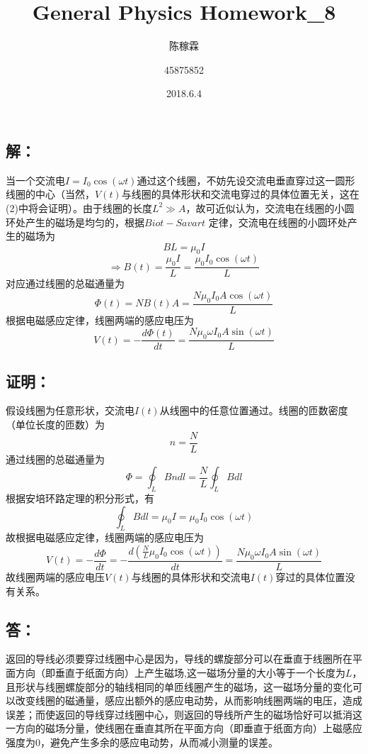 \documentclass[10pt,a4paper]{article}
\title{General Physics Homework\_{}8}
\author{陈稼霖 \and 45875852}
\date{2018.6.4}
\theoremstyle{remark}
\begin{document}
\maketitle
\section{}
\subsection{解：}
当一个交流电$I = I_0\cos(\omega t)$通过这个线圈，不妨先设交流电垂直穿过这一圆形线圈的中心（当然，$V(t)$与线圈的具体形状和交流电穿过的具体位置无关，这在(2)中将会证明）。由于线圈的长度$L^2\gg A$，故可近似认为，交流电在线圈的小圆环处产生的磁场是均匀的，根据$Biot-Savart$ 定律，交流电在线圈的小圆环处产生的磁场为
\[
BL = \mu_0I
\]
\[
\Rightarrow B(t) = \frac{\mu_0I}{L} = \frac{\mu_0I_0\cos(\omega t)}{L}
\]
对应通过线圈的总磁通量为
\[
\Phi(t) = NB(t)A = \frac{N\mu_0I_0A\cos(\omega t)}{L}
\]
根据电磁感应定律，线圈两端的感应电压为
\[
V(t) = - \frac{d\Phi(t)}{dt} = \frac{N\mu_0\omega I_0A\sin(\omega t)}{L}
\]
\subsection{证明：}
假设线圈为任意形状，交流电$I(t)$从线圈中的任意位置通过。线圈的匝数密度（单位长度的匝数）为
\begin{equation}
\label{CoilTensity}
n = \frac{N}{L}
\end{equation}
通过线圈的总磁通量为
\[
\Phi = \oint_LBndl = \frac{N}{L}\oint_LBdl
\]
根据安培环路定理的积分形式，有
\[
\oint_LBdl = \mu_0I = \mu_0I_0\cos(\omega t)
\]
故根据电磁感应定律，线圈两端的感应电压为
\begin{equation}
\label{Magnetism}
V(t) = - \frac{d\Phi}{dt} = - \frac{d(\frac{N}{L}\mu_0I_0\cos(\omega t))}{dt} = \frac{N\mu_0\omega I_0A\sin(\omega t)}{L}
\end{equation}
故线圈两端的感应电压$V(t)$与线圈的具体形状和交流电$I(t)$穿过的具体位置没有关系。
\subsection{答：}
返回的导线必须要穿过线圈中心是因为，导线的螺旋部分可以在垂直于线圈所在平面方向（即垂直于纸面方向）上产生磁场,这一磁场分量的大小等于一个长度为$L$，且形状与线圈螺旋部分的轴线相同的单匝线圈产生的磁场，这一磁场分量的变化可以改变线圈的磁通量，感应出额外的感应电动势，从而影响线圈两端的电压，造成误差；而使返回的导线穿过线圈中心，则返回的导线所产生的磁场恰好可以抵消这一方向的磁场分量，使线圈在垂直其所在平面方向（即垂直于纸面方向）上磁感应强度为$0$，避免产生多余的感应电动势，从而减小测量的误差。
\end{document}
